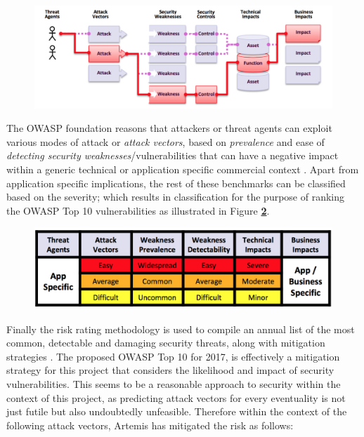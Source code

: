 \begin{figure}[H]
	\centering
	\includegraphics[scale=0.5]{figures/attack}
	\label{fig:Consideration of Threat Agents}
\end{figure}

The OWASP foundation reasons \cite{OWASP2017} that attackers or threat agents can exploit various modes of attack or \textit{attack vectors}, based on \textit{prevalence} and ease of \textit{detecting security weaknesses}/vulnerabilities that can have a negative impact  within a generic technical or application specific commercial context \cite{OWASP2017}. Apart from application specific implications, the rest of these benchmarks can be classified based on the severity; which results in classification for the purpose of ranking the OWASP Top 10 vulnerabilities as illustrated in Figure \textbf{\ref{fig:OWASP Risk Rating Methodology}}.

\begin{figure}[H]
	\centering
	\includegraphics[scale=0.85]{figures/tabulation}
	\label{fig:OWASP Risk Rating Methodology}
\end{figure}

Finally the risk rating methodology is used to compile an annual list of the most common, detectable and damaging security threats, along with mitigation strategies \cite{OWASP2017}. The proposed OWASP Top 10 for 2017, is effectively a mitigation strategy for this project that considers the likelihood and impact of security vulnerabilities. This seems to be a reasonable approach to security within the context of this project, as predicting attack vectors for every eventuality is not just futile but also undoubtedly unfeasible. Therefore within the context of the following attack vectors, Artemis has mitigated the risk as follows:



